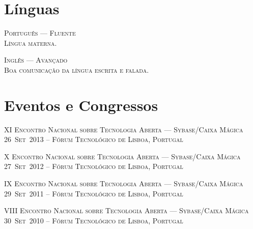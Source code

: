 \documentclass[a4paper,fontsize=10pt]{scrartcl} %
\begin{document}
\begin{minipage}[t]{0.46\textwidth}
\section{Línguas}
\textsc{Português --- Fluente}\\
\small\textsc{Língua materna.}
\\\par
\textsc{Inglês --- Avançado}\\
\small\textsc{Boa comunicação da língua escrita e falada.}
\\\par
\section{Eventos e Congressos}
\textsc{XI Encontro Nacional sobre Tecnologia Aberta --- Sybase/Caixa Mágica}\\
\small\textsc{26~Set~2013 -- Fórum Tecnológico de Lisboa, Portugal}\\ \normalsize
\par
\textsc{X Encontro Nacional sobre Tecnologia Aberta --- Sybase/Caixa Mágica}\\
\small\textsc{27~Set~2012 -- Fórum Tecnológico de Lisboa, Portugal}\\ \normalsize
\par
\textsc{IX Encontro Nacional sobre Tecnologia Aberta --- Sybase/Caixa Mágica}\\
\small\textsc{29~Set~2011 -- Fórum Tecnológico de Lisboa, Portugal}\\ \normalsize
\par
\textsc{VIII Encontro Nacional sobre Tecnologia Aberta --- Sybase/Caixa Mágica}\\
\small\textsc{30~Set~2010 -- Fórum Tecnológico de Lisboa, Portugal}\\ \normalsize

\end{minipage}
\end{document}
